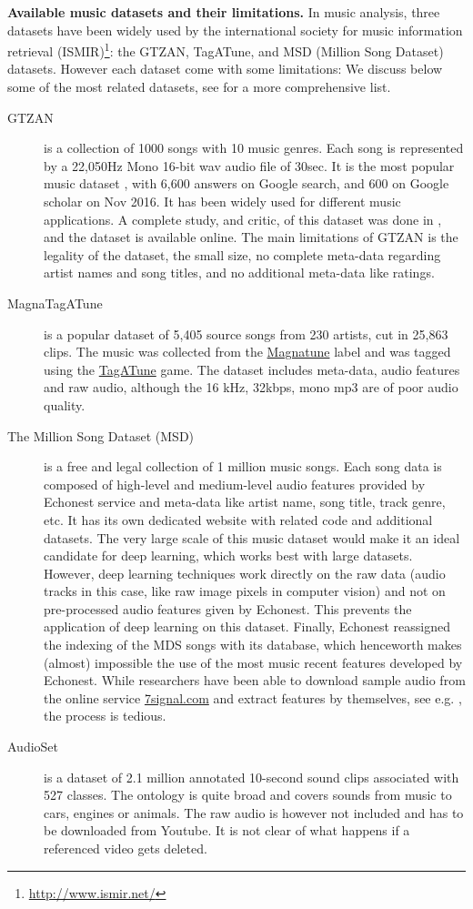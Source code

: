 \documentclass{article}
\begin{document}
\noindent
{\bf Available music datasets and their limitations.} In music analysis, three datasets have been widely used by the international society for music information retrieval (ISMIR)\footnote{\url{http://www.ismir.net/}}: the GTZAN, TagATune, and MSD (Million Song Dataset) datasets. However each dataset come with some limitations:
We discuss below some of the most related datasets, see  for a more comprehensive list.
\begin{description}
	\item[GTZAN] \cite{gtzan} is a collection of 1000 songs with 10 music genres. Each song is represented by a 22,050Hz Mono 16-bit wav audio file of 30sec. It is the most popular music dataset \cite{mgr_eval}, with 6,600 answers on Google search, and 600 on Google scholar on Nov 2016. It has been widely used for different music applications. A complete study, and critic, of this dataset was done in \cite{gtzan_critic_1}, and the dataset is available online. The main limitations of GTZAN is the legality of the dataset, the small size, no complete meta-data regarding artist names and song titles, and no additional meta-data like ratings.
	\item[MagnaTagATune] \cite{magnatagatune} is a popular dataset of 5,405 source songs from 230 artists, cut in 25,863 clips. The music was collected from the \href{https://magnatune.com/}{Magnatune} label and was tagged using the \href{http://tagatune.org/}{TagATune} game. The dataset includes meta-data, audio features and raw audio, although the 16 kHz, 32kbps, mono mp3 are of poor audio quality.
	\item[The Million Song Dataset (MSD)] \cite{msd} is a free and legal collection of 1 million music songs. Each song data is composed of high-level and medium-level audio features provided by  Echonest service and meta-data like artist name, song title, track genre, etc. It has its own dedicated website with related code and additional datasets. The very large scale of this music dataset would make it an ideal candidate for deep learning, which works best with large datasets. However, deep learning techniques work directly on the raw data (audio tracks in this case, like raw image pixels in computer vision) and not on pre-processed audio features given by Echonest. This prevents the application of deep learning on this dataset. Finally, Echonest reassigned the indexing of the MDS songs with its database, which henceworth makes (almost) impossible the use of the most music recent features developed by Echonest.
		While researchers have been able to download sample audio from the online service \url{7signal.com} and extract features by themselves, see e.g. \cite{msd_features}, the process is tedious.
	\item[AudioSet] \cite{audioset} is a dataset of 2.1 million annotated 10-second sound clips associated with 527 classes. The ontology is quite broad and covers sounds from music to cars, engines or animals. The raw audio is however not included and has to be downloaded from Youtube. It is not clear of what happens if a referenced video gets deleted.
\end{description}
\end{document}
